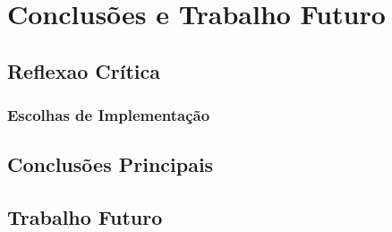 \chapter{Conclusões e Trabalho Futuro}
\label{chap:conc-trab-futuro}

\section{Reflexao Crítica}
\subsection*{Escolhas de Implementação}
\section{Conclusões Principais}
\label{sec:conc-princ}


\section{Trabalho Futuro}
\label{sec:trab-futuro}

